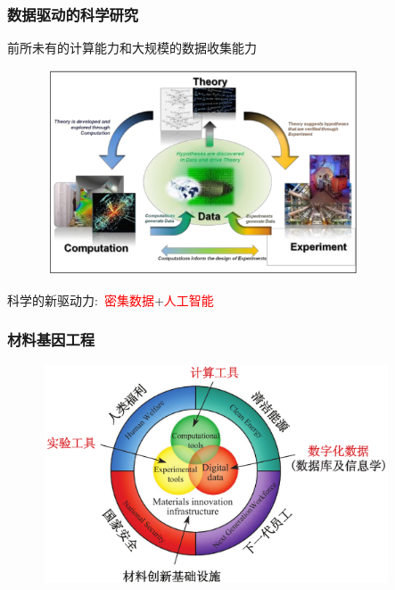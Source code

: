 \frame
{
	\frametitle{数据驱动的科学研究}
前所未有的计算能力和大规模的数据收集能力%
\begin{figure}[h!]
\centering
\includegraphics[height=2.40in,width=3.75in]{Figures/Four_Model_1.png}
\label{Four_Model_1}
\end{figure}
科学的新驱动力:~\textcolor{red}{密集数据}+\textcolor{red}{人工智能}\\
}

\frame
{
	\frametitle{材料基因工程}
\begin{figure}[h!]
\vspace*{-0.18in}
\centering
\includegraphics[height=2.55in,width=4.05in]{Figures/MGE.png}
\label{MGE}
\end{figure}
}

